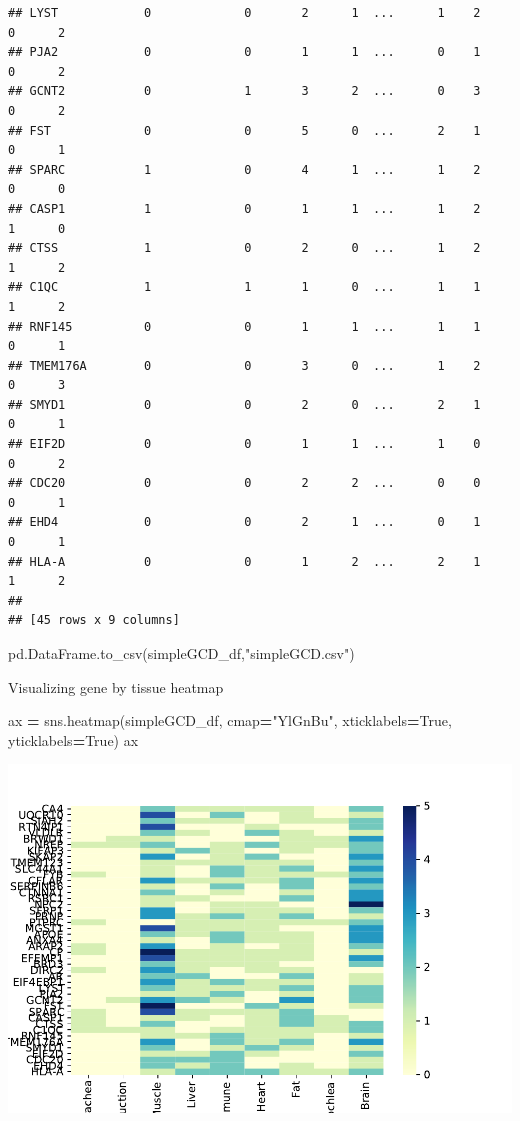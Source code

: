 \documentclass[
]{article}
\newenvironment{Shaded}{\begin{snugshade}}{\end{snugshade}}
\newcommand{\NormalTok}[1]{#1}
\newcommand{\OperatorTok}[1]{\textcolor[rgb]{0.81,0.36,0.00}{\textbf{#1}}}
\newcommand{\StringTok}[1]{\textcolor[rgb]{0.31,0.60,0.02}{#1}}
\newcommand{\VariableTok}[1]{\textcolor[rgb]{0.00,0.00,0.00}{#1}}
\begin{document}
\begin{verbatim}
## LYST            0             0       2      1  ...      1    2        0      2
## PJA2            0             0       1      1  ...      0    1        0      2
## GCNT2           0             1       3      2  ...      0    3        0      2
## FST             0             0       5      0  ...      2    1        0      1
## SPARC           1             0       4      1  ...      1    2        0      0
## CASP1           1             0       1      1  ...      1    2        1      0
## CTSS            1             0       2      0  ...      1    2        1      2
## C1QC            1             1       1      0  ...      1    1        1      2
## RNF145          0             0       1      1  ...      1    1        0      1
## TMEM176A        0             0       3      0  ...      1    2        0      3
## SMYD1           0             0       2      0  ...      2    1        0      1
## EIF2D           0             0       1      1  ...      1    0        0      2
## CDC20           0             0       2      2  ...      0    0        0      1
## EHD4            0             0       2      1  ...      0    1        0      1
## HLA-A           0             0       1      2  ...      2    1        1      2
## 
## [45 rows x 9 columns]
\end{verbatim}

\begin{Shaded}
\begin{Highlighting}[]
\NormalTok{pd.DataFrame.to_csv(simpleGCD_df,}\StringTok{"simpleGCD.csv"}\NormalTok{)}
\end{Highlighting}
\end{Shaded}

Visualizing gene by tissue heatmap

\begin{Shaded}
\begin{Highlighting}[]
\NormalTok{ax }\OperatorTok{=}\NormalTok{ sns.heatmap(simpleGCD_df, cmap}\OperatorTok{=}\StringTok{"YlGnBu"}\NormalTok{, xticklabels}\OperatorTok{=}\VariableTok{True}\NormalTok{, yticklabels}\OperatorTok{=}\VariableTok{True}\NormalTok{)}
\NormalTok{ax}
\end{Highlighting}
\end{Shaded}

\includegraphics{Thesis_DualCodeTest_files/figure-latex/unnamed-chunk-34-1.pdf}
\end{document}
